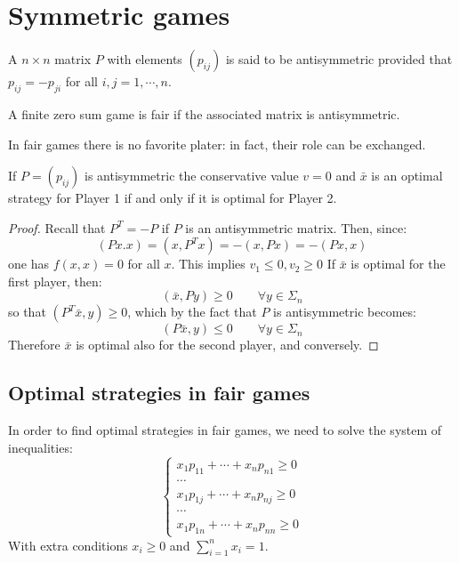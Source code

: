 \section{Symmetric games}

\begin{definition}
    A $n \times n$ matrix $P$ with elements $(p_{ij})$ is said to be antisymmetric provided that $p_{ij}=-p_{ji}$ for all $i,j=1,\cdots,n$. 
\end{definition}
\begin{definition}
    A finite zero sum game is fair if the associated matrix is antisymmetric.
\end{definition}
In fair games there is no favorite plater: in fact, their role can be exchanged. 
\begin{proposition}
    If $P=(p_{ij})$ is antisymmetric the conservative value $v=0$ and $\bar{x}$ is an optimal strategy for Player 1 if and only if it is optimal for Player 2.
\end{proposition}
\begin{proof}
    Recall that $P^T=-P$ if $P$ is an antisymmetric matrix. 
    Then, since: 
    \[(Px.x)=(x,P^Tx)=-(x,Px)=-(Px,x)\]
    one has $f(x,x)=0$ for all $x$. 
    This implies $v_1\leq 0,v_2\geq 0$
    If $\bar{x}$ is optimal for the first player, then: 
    \[(\bar{x},Py)\geq 0 \qquad \forall y \in \Sigma_n\]
    so that $(P^T\bar{x},y)\geq 0$, which by the fact that $P$ is antisymmetric becomes: 
    \[(P\bar{x},y)\leq 0 \qquad \forall y \in \Sigma_n\]
    Therefore $\bar{x}$ is optimal also for the second player, and conversely.
\end{proof}

\subsection{Optimal strategies in fair games}
In order to find optimal strategies in fair games, we need to solve the system of inequalities: 
\[\begin{cases}
    x_1p_{11}+\cdots+x_np_{n1}\geq 0 \\
    \cdots \\
    x_1p_{1j}+\cdots+x_np_{nj}\geq 0 \\
    \cdots \\
    x_1p_{1n}+\cdots+x_np_{nn}\geq 0
\end{cases}\]
With extra conditions $x_i\geq 0$ and $\sum_{i=1}^nx_i=1$. 